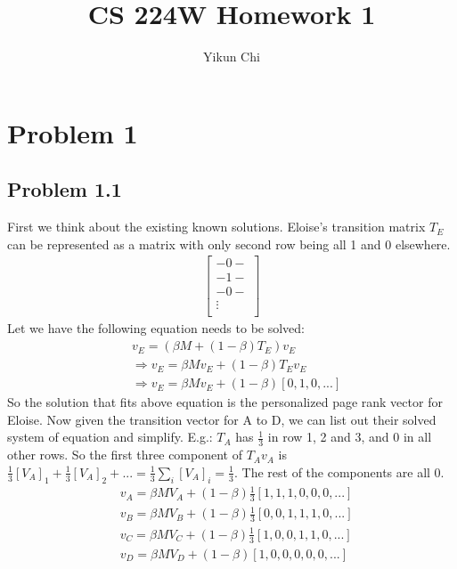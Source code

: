 \documentclass{book}
\title{CS 224W Homework 1}
\author{Yikun Chi}
\begin{document}
\maketitle

\section*{Problem 1}
\subsection*{Problem 1.1}
First we think about the existing known solutions. Eloise's transition matrix $T_E$ can be represented as a matrix with only second row being all 1 and 0 elsewhere. 
    \begin{align*}
        \begin{bmatrix}
            -0-\\
            -1-\\
            -0-\\
            \vdots \\
        \end{bmatrix}
    \end{align*}
Let we have the following equation needs to be solved: 
    \begin{align*}
        & v_E = (\beta M + (1 - \beta)T_E)v_E \\
        & \Longrightarrow v_E = \beta M v_E + (1 - \beta) T_E v_E \\
        & \Longrightarrow v_E = \beta M v_E + (1 - \beta) [0, 1, 0, ...] \tag{$V_E$ normalized and given $T_e$}
    \end{align*}
So the solution that fits above equation is the personalized page rank vector for Eloise. Now given the transition vector for A to D, we can list out their solved system of equation and simplify. E.g.: $T_A$ has $\frac{1}{3}$ in row 1, 2 and 3, and 0 in all other rows. So the first three component of $T_A v_A$ is $\frac{1}{3} [V_A]_1 + \frac{1}{3} [V_A]_2 + ... = \frac{1}{3}\sum_i [V_A]_i = \frac{1}{3}$. The rest of the components are all 0. 
    \begin{align*}
        & v_A = \beta M V_A + (1-\beta) \frac{1}{3}[1, 1, 1, 0, 0, 0, ...] \\
        & v_B = \beta M V_B + (1-\beta) \frac{1}{3}[0, 0, 1, 1, 1, 0, ...] \\
        & v_C = \beta M V_C + (1-\beta) \frac{1}{3}[1, 0, 0, 1, 1, 0, ...] \\
        & v_D = \beta M V_D + (1-\beta) [1, 0, 0, 0, 0, 0, ...] \\
    \end{align*}
\end{document}
